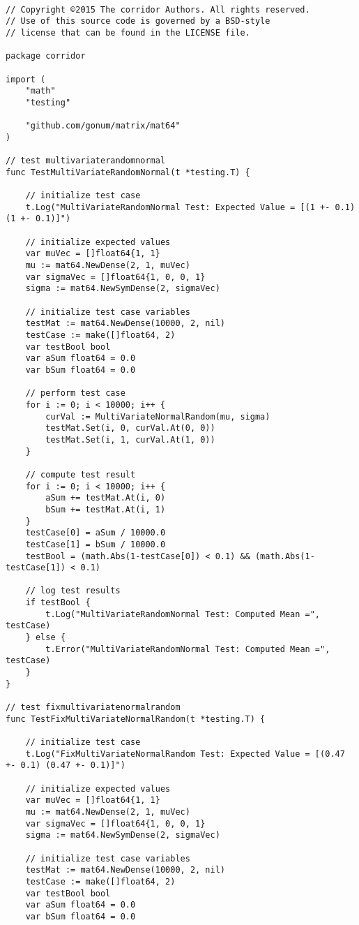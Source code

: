 \begin{lstlisting}[basicstyle=\tiny]

// Copyright ©2015 The corridor Authors. All rights reserved.
// Use of this source code is governed by a BSD-style
// license that can be found in the LICENSE file.

package corridor

import (
	"math"
	"testing"

	"github.com/gonum/matrix/mat64"
)

// test multivariaterandomnormal
func TestMultiVariateRandomNormal(t *testing.T) {

	// initialize test case
	t.Log("MultiVariateRandomNormal Test: Expected Value = [(1 +- 0.1) (1 +- 0.1)]")

	// initialize expected values
	var muVec = []float64{1, 1}
	mu := mat64.NewDense(2, 1, muVec)
	var sigmaVec = []float64{1, 0, 0, 1}
	sigma := mat64.NewSymDense(2, sigmaVec)

	// initialize test case variables
	testMat := mat64.NewDense(10000, 2, nil)
	testCase := make([]float64, 2)
	var testBool bool
	var aSum float64 = 0.0
	var bSum float64 = 0.0

	// perform test case
	for i := 0; i < 10000; i++ {
		curVal := MultiVariateNormalRandom(mu, sigma)
		testMat.Set(i, 0, curVal.At(0, 0))
		testMat.Set(i, 1, curVal.At(1, 0))
	}

	// compute test result
	for i := 0; i < 10000; i++ {
		aSum += testMat.At(i, 0)
		bSum += testMat.At(i, 1)
	}
	testCase[0] = aSum / 10000.0
	testCase[1] = bSum / 10000.0
	testBool = (math.Abs(1-testCase[0]) < 0.1) && (math.Abs(1-testCase[1]) < 0.1)

	// log test results
	if testBool {
		t.Log("MultiVariateRandomNormal Test: Computed Mean =", testCase)
	} else {
		t.Error("MultiVariateRandomNormal Test: Computed Mean =", testCase)
	}
}

// test fixmultivariatenormalrandom
func TestFixMultiVariateNormalRandom(t *testing.T) {

	// initialize test case
	t.Log("FixMultiVariateNormalRandom Test: Expected Value = [(0.47 +- 0.1) (0.47 +- 0.1)]")

	// initialize expected values
	var muVec = []float64{1, 1}
	mu := mat64.NewDense(2, 1, muVec)
	var sigmaVec = []float64{1, 0, 0, 1}
	sigma := mat64.NewSymDense(2, sigmaVec)

	// initialize test case variables
	testMat := mat64.NewDense(10000, 2, nil)
	testCase := make([]float64, 2)
	var testBool bool
	var aSum float64 = 0.0
	var bSum float64 = 0.0


\end{lstlisting}
